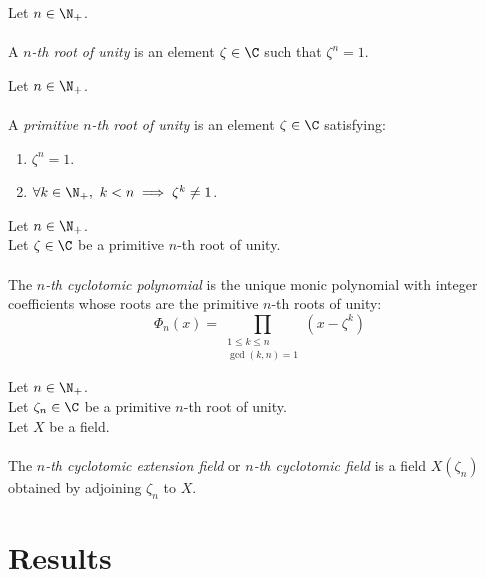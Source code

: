 \begin{definition-pre}
    \label{def:root_of_unity}
    Let $n \in \N_{+}$. \\\\
    A \textit{$n$-th root of unity} is an element $\zeta \in \C$ such that  $\zeta^n = 1$.
\end{definition-pre}

\begin{definition-pre}
    \label{def:primitive_root_of_unity}
    Let $n \in \N_{+}$. \\\\
    A \textit{primitive $n$-th root of unity} is an element $\zeta \in \C$ satisfying:
    \begin{enumerate}
        \item $\zeta^n = 1$.
        \item $\forall k \in \N_{+},\ k < n \implies \zeta^k \neq 1$.
    \end{enumerate}
\end{definition-pre}

\begin{definition-pre}
    \label{def:cyclotomic_polynomial}
    Let $n \in \N_{+}$. \\
    Let $\zeta \in \C$ be a primitive $n$-th root of unity. \\\\
    The \textit{$n$-th cyclotomic polynomial} is the unique monic polynomial with integer coefficients whose roots are the primitive $n$-th roots of unity:
    $$ \Phi_n(x) = \prod_{\substack{1 \leq k \leq n \\ \gcd(k, n) = 1}} \left( x - \zeta^k \right)$$
\end{definition-pre}

\begin{definition-pre}
    \label{def:cyclotomic_extension_field}
    Let $n \in \N_{+}$. \\
    Let $\zeta_n \in \C$ be a primitive $n$-th root of unity. \\
    Let $X$ be a field. \\\\
    The \textit{$n$-th cyclotomic extension field} or \textit{$n$-th cyclotomic field} is a field $X(\zeta_n)$ obtained by adjoining $\zeta_n$ to $X$.
\end{definition-pre}

\newpage
\section{Results}

